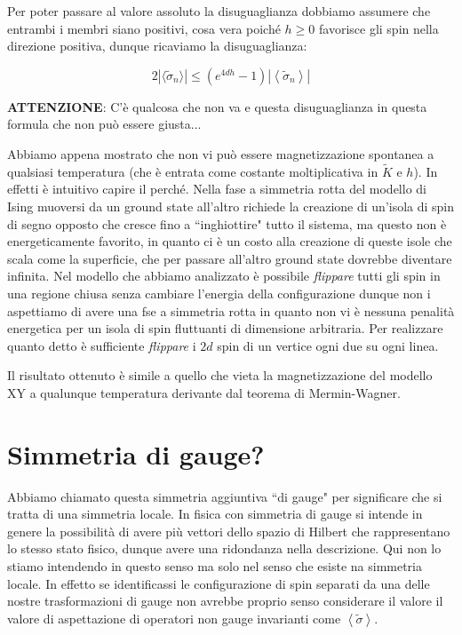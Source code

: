 \documentclass[12pt,a4paper]{article}
\begin{document}
Per poter passare al valore assoluto la disuguaglianza dobbiamo assumere che entrambi i membri siano positivi, cosa vera poiché $h \geq 0$ favorisce gli spin nella direzione positiva, dunque ricaviamo la disuguaglianza:

\[
2 |\langle \tilde{\sigma}_n \rangle | \leq  \left( e^{4 d h} - 1 \right) \left| \left<  \tilde{\sigma}_n \right> \right| 
\]

\textbf{ATTENZIONE}: C'è qualcosa che non va e questa disuguaglianza in questa formula che non può essere giusta...


Abbiamo appena mostrato che non vi può essere magnetizzazione spontanea a qualsiasi temperatura (che è entrata come costante moltiplicativa in $\tilde{K}$ e $h$). In effetti è intuitivo capire il perché. Nella fase a simmetria rotta del modello di Ising muoversi da un ground state all'altro richiede la creazione di un'isola di spin di segno opposto che cresce fino a  ``inghiottire" tutto il sistema, ma questo non è energeticamente favorito, in quanto ci è un costo alla creazione di queste isole che scala come la superficie, che per passare all'altro ground state dovrebbe diventare infinita.
Nel modello che abbiamo analizzato è possibile \emph{flippare} tutti gli spin in una regione chiusa senza cambiare l'energia della configurazione dunque non i aspettiamo di avere una fse a simmetria rotta in quanto non vi è nessuna penalità energetica per un isola di spin fluttuanti di dimensione arbitraria. Per realizzare quanto detto è sufficiente \emph{flippare} i $2d$ spin di un vertice ogni due su ogni linea.

Il risultato ottenuto è simile a quello che vieta la magnetizzazione del modello XY a qualunque temperatura derivante dal teorema di Mermin-Wagner.

\section{Simmetria di gauge?}
Abbiamo chiamato questa simmetria aggiuntiva ``di gauge" per significare che si tratta di una simmetria locale. In fisica con simmetria di gauge si intende in genere la possibilità di avere più vettori dello spazio di Hilbert che rappresentano lo stesso stato fisico, dunque avere una ridondanza nella descrizione. Qui non lo stiamo intendendo in questo senso ma solo nel senso che esiste na simmetria locale. In effetto se identificassi le configurazione di spin separati da una delle nostre trasformazioni di gauge non avrebbe proprio senso considerare il valore il valore di aspettazione di operatori non gauge invarianti come $\left< \tilde{\sigma} \right>$.
\end{document}
